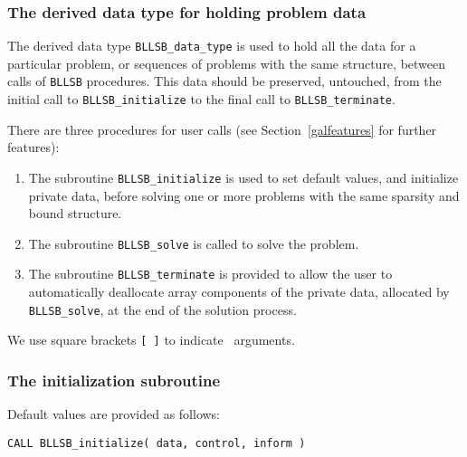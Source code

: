 \documentclass{galahad}
\newcommand{\packagename}{BLLSB}
\begin{document}

\subsubsection{The derived data type for holding problem data}\label{typedata}
The derived data type
{\tt \packagename\_data\_type}
is used to hold all the data for a particular problem,
or sequences of problems with the same structure, between calls of
{\tt \packagename} procedures.
This data should be preserved, untouched, from the initial call to
{\tt \packagename\_initialize}
to the final call to
{\tt \packagename\_terminate}.


\galarguments
There are three procedures for user calls
(see Section~\ref{galfeatures} for further features):

\begin{enumerate}
\item The subroutine
      {\tt \packagename\_initialize}
      is used to set default values, and initialize private data,
      before solving one or more problems with the
      same sparsity and bound structure.
\item The subroutine
      {\tt \packagename\_solve}
      is called to solve the problem.
\item The subroutine
      {\tt \packagename\_terminate}
      is provided to allow the user to automatically deallocate array
       components of the private data, allocated by
       {\tt \packagename\_solve},
       at the end of the solution process.
\end{enumerate}
We use square brackets {\tt [ ]} to indicate \optional\ arguments.


\subsubsection{The initialization subroutine}\label{subinit}
 Default values are provided as follows:
\vspace*{1mm}

\hspace{8mm}
{\tt CALL \packagename\_initialize( data, control, inform )}
\end{document}
